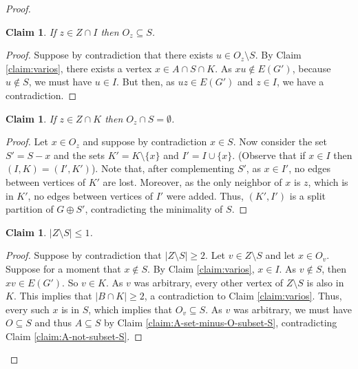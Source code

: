 \documentclass[11pt]{article}
\newtheorem{claim}[theorem]{Claim}
\theoremstyle{definition}
\begin{document}
\begin{proof}
    \begin{claim}\label{claim:z-in-ZcapI-then-Oz-subseteq-S}
            If $z \in Z \cap I$ then $O_z \subseteq S$.
    \end{claim}
    \begin{proof}
    Suppose by contradiction that there exists $u \in O_z \setminus S$.
        By Claim \ref{claim:varios}, there exists a vertex $x \in A \cap S \cap K$. As $xu \notin E(G')$, because $u \notin S$, we must have $u \in I$.
        But then, as $uz \in E(G')$ and $z \in I$, we have a contradiction.
       \end{proof}

    

     \begin{claim}\label{claim:z-in-ZcapK-then-Oz-cap-S-emptyset}
       If $z \in Z \cap K$ then  $O_z \cap S = \emptyset$.
    \end{claim}
    \begin{proof}
    Let $x \in O_z$ and suppose by contradiction $x \in S$.
    Now consider the set $S'= S-x$
    and the sets $K'=K \setminus \{x\}$ and $I'=I \cup \{x\}$. (Observe that if $x \in I$ then $(I,K)=(I',K')$).
        Note that, after complementing $S'$, as $x\in I'$, no edges between vertices of $K'$ are lost.
         Moreover, as the only neighbor of $x$ is $z$, which is in $K'$, no edges between vertices of $I'$ were added. 
Thus, $(K',I')$ is a split partition of $G \oplus S'$, contradicting the minimality of $S$. %
    \end{proof} 

    \begin{claim}\label{claim:Z-setminus-S-leq-1}
       $|Z \setminus S| \leq 1$.
     \end{claim}
     \begin{proof}
         Suppose by contradiction that $|Z \setminus S| \geq 2$.
Let $v \in Z \setminus S$ and let $x \in O_v$. Suppose for a moment that $x \notin S$. By Claim \ref{claim:varios}, $x \in I$. As $v \notin S$, then $xv \in E(G')$. So $v \in K$. As $v$ was arbitrary, every other vertex of $Z \setminus S$ is also in $K$. This implies that $|B \cap K| \geq 2$, a contradiction to Claim \ref{claim:varios}. Thus, every such $x$ is in $S$,
which implies that $O_v \subseteq S$. As $v$ was arbitrary, we must have $O \subseteq S$ and thus $A \subseteq S$ by Claim \ref{claim:A-set-minus-O-subset-S}, contradicting Claim \ref{claim:A-not-subset-S}.
     \end{proof}
    

\end{proof}
\end{document}

